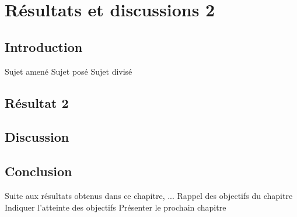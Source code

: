 \chapter{Résultats et discussions 2}
\label{chap:chap_5}
\section*{Introduction}
Sujet amené
Sujet posé
Sujet divisé

\section{Résultat 2}


\section{Discussion}

\section{Conclusion}
Suite aux résultats obtenus dans ce chapitre, ...
Rappel des objectifs du chapitre
Indiquer l'atteinte des objectifs
Présenter le prochain chapitre